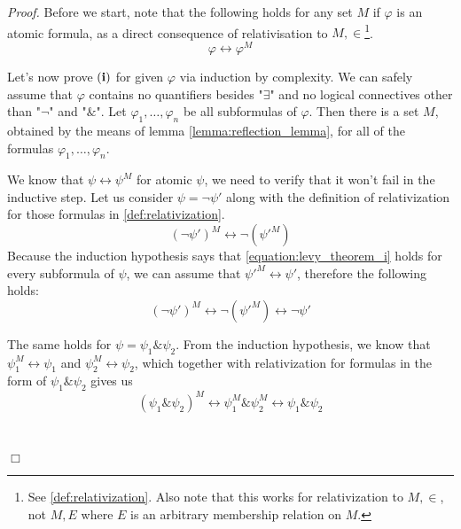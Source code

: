 \documentclass[12pt,a4paper]{article}
\newenvironment{proof}
{\noindent \textit{Proof.}}
{\hspace*{\fill} $\Box$}
\renewcommand{\iff}{\leftrightarrow}
\newcommand{\et}{\mathrel{\&}}
\begin{document}
\begin{proof}
Before we start, note that the following holds for any set $M$ if $\varphi$ is an atomic formula, as a direct consequence of relativisation to $M, \in$\footnote{See \ref{def:relativization}. Also note that this works for relativization to $M, \in$, not $M, E$ where $E$ is an arbitrary membership relation on $M$.}. 
\begin{equation}
\varphi \iff \varphi^M
\end{equation}

Let's now prove $\bold{(i)}$ for given $\varphi$ via induction by complexity. We can safely assume that $\varphi$ contains no quantifiers besides "$\exists$" and no logical connectives other than "$\neg$" and "$\et$".
Let $\varphi_1, \ldots, \varphi_n$ be all subformulas of $\varphi$. Then there is a set $M$, obtained by the means of lemma \ref{lemma:reflection_lemma}, for all of the formulas $\varphi_1, \ldots, \varphi_n$. 

We know that $\psi \iff \psi^M$ for atomic $\psi$, we need to verify that it won't fail in the inductive step.
Let us consider $\psi = \neg \psi'$ along with the definition of relativization for those formulas in \ref{def:relativization}.
\begin{equation}
(\neg \psi')^M \iff \neg (\psi'^M)
\end{equation}
Because the induction hypothesis says that \ref{equation:levy_theorem_i} holds for every subformula of $\psi$, we can assume that $\psi'^M \iff \psi'$, therefore the following holds:
\begin{equation}
 (\neg \psi')^{M} \iff \neg (\psi'^M) \iff \neg \psi'
\end{equation}

The same holds for $\psi = \psi_1 \et \psi_2$. From the induction hypothesis, we know that $\psi_1^M \iff \psi_1$ and $\psi_2^M \iff \psi_2$, which together with relativization for formulas in the form of $\psi_1 \et \psi_2$ gives us
\begin{equation}
(\psi_1 \et \psi_2)^M \iff \psi_1^M \et \psi_2^M \iff \psi_1 \et \psi_2
\end{equation}

\


\end{proof}
\end{document}
